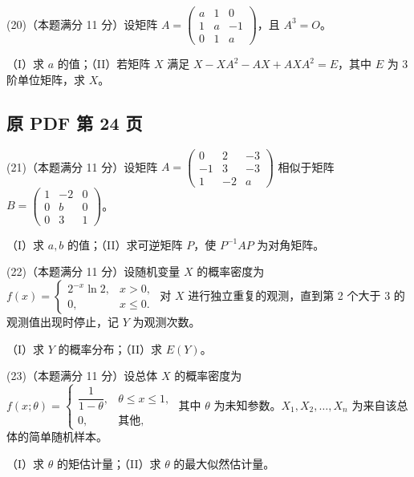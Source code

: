 \documentclass[UTF8,12pt]{ctexart}
\begin{document}
(20)（本题满分 11 分）设矩阵 \(\displaystyle A=\begin{pmatrix}a&1&0\\1&a&-1\\0&1&a\end{pmatrix}\)，且 \(\displaystyle A^3=O\)。


（I）求 \(\displaystyle a\) 的值；（II）若矩阵 \(\displaystyle X\) 满足 \(\displaystyle X-XA^2-AX+AXA^2=E\)，其中 \(\displaystyle E\) 为 3 阶单位矩阵，求 \(\displaystyle X\)。


\clearpage

\subsection*{原 PDF 第 24 页}

(21)（本题满分 11 分）设矩阵 \(\displaystyle A=\begin{pmatrix}0&2&-3\\-1&3&-3\\1&-2&a\end{pmatrix}\) 相似于矩阵 \(\displaystyle B=\begin{pmatrix}1&-2&0\\0&b&0\\0&3&1\end{pmatrix}\)。


（I）求 \(\displaystyle a,\allowbreak b\) 的值；（II）求可逆矩阵 \(\displaystyle P\)，使 \(\displaystyle P^{-1}AP\) 为对角矩阵。


(22)（本题满分 11 分）设随机变量 \(\displaystyle X\) 的概率密度为 \(\displaystyle f(x)=\begin{cases}2^{-x}\ln 2,\allowbreak &x>0,\allowbreak \\0,\allowbreak &x\leq0.\end{cases}\) 对 \(\displaystyle X\) 进行独立重复的观测，直到第 2 个大于 3 的观测值出现时停止，记 \(\displaystyle Y\) 为观测次数。


（I）求 \(\displaystyle Y\) 的概率分布；（II）求 \(\displaystyle E(Y)\)。


(23)（本题满分 11 分）设总体 \(\displaystyle X\) 的概率密度为 \(\displaystyle f(x;\theta)=\begin{cases}\dfrac{\displaystyle 1}{\displaystyle 1-\theta},\allowbreak &\theta\leq x\leq1,\allowbreak \\0,\allowbreak &\text{其他},\allowbreak \end{cases}\) 其中 \(\displaystyle \theta\) 为未知参数。\(\displaystyle X_1,\allowbreak X_2,\allowbreak \ldots,\allowbreak X_n\) 为来自该总体的简单随机样本。


（I）求 \(\displaystyle \theta\) 的矩估计量；（II）求 \(\displaystyle \theta\) 的最大似然估计量。


\clearpage
\end{document}
